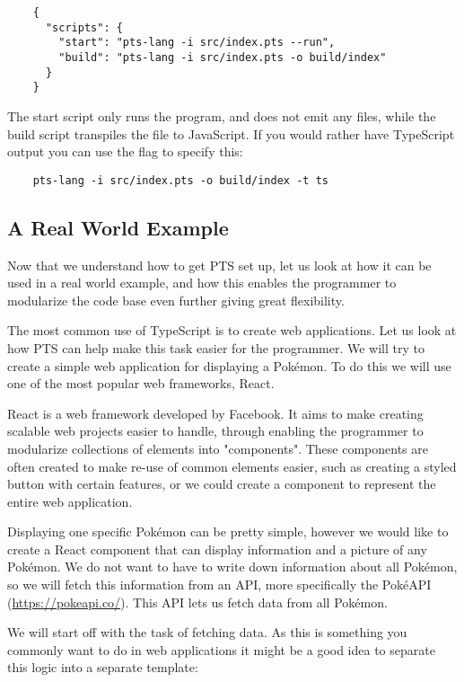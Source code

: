 \begin{verbatim}
    {
      "scripts": {
        "start": "pts-lang -i src/index.pts --run",
        "build": "pts-lang -i src/index.pts -o build/index"
      }
    }
\end{verbatim}

The start script only runs the program, and does not emit any files, while the build script transpiles the  file to JavaScript.
If you would rather have TypeScript output you can use the  flag to specify this:

\begin{verbatim}
    pts-lang -i src/index.pts -o build/index -t ts
\end{verbatim}

\subsection{A Real World Example}\label{subsec:a-real-world-example}

Now that we understand how to get PTS set up, let us look at how it can be used in a real world example, and how this enables the programmer to modularize the code base even further giving great flexibility.

The most common use of TypeScript is to create web applications.
Let us look at how PTS can help make this task easier for the programmer.
We will try to create a simple web application for displaying a Pokémon.
To do this we will use one of the most popular web frameworks, React.

React is a web framework developed by Facebook.
It aims to make creating scalable web projects easier to handle, through enabling the programmer to modularize collections of elements into "components".
These components are often created to make re-use of common elements easier, such as creating a styled button with certain features, or we could create a component to represent the entire web application.

Displaying one specific Pokémon can be pretty simple, however we would like to create a React component that can display information and a picture of any Pokémon.
We do not want to have to write down information about all Pokémon, so we will fetch this information from an API, more specifically the PokéAPI (\url{https://pokeapi.co/}).
This API lets us fetch data from all Pokémon.

We will start off with the task of fetching data.
As this is something you commonly want to do in web applications it might be a good idea to separate this logic into a separate template:

